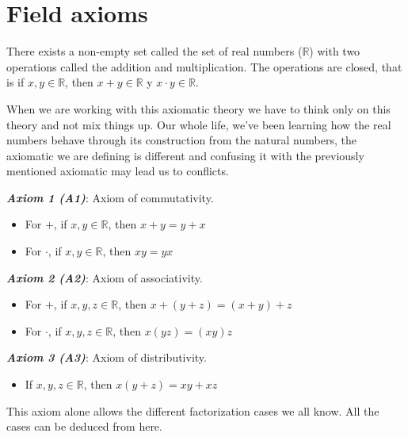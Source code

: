 \documentclass{report}
\begin{document}
    \section{Field axioms}

    There exists a non-empty set called the set of real numbers ($\mathbb{R}$) with two operations called the addition and multiplication. The operations are closed, that is if $x,y \in \mathbb{R}$, then $x+y \in \mathbb{R}$ y $x\cdot y \in \mathbb{R}$.

    \begin{noteBox}
        When we are working with this axiomatic theory we have to think only on this theory and not mix things up. Our whole life, we've been learning how the real numbers behave through its construction from the natural numbers, the axiomatic we are defining is different and confusing it with the previously mentioned axiomatic may lead us to conflicts.
    \end{noteBox}

    \begin{axBox}
        \textit{\textbf{Axiom 1 (A1)}}: Axiom of commutativity.
        \begin{itemize}
            \item For $+$, if $x,y \in \mathbb{R}$, then $x+y = y+x$
            \item For $\cdot$, if $x,y \in \mathbb{R}$, then $xy = yx$
        \end{itemize}
    \end{axBox}

    \begin{axBox}
        \textit{\textbf{Axiom 2 (A2)}}: Axiom of associativity.
        \begin{itemize}
            \item For $+$, if $x,y,z \in \mathbb{R}$, then $x+(y+z) = (x+y) + z$
            \item For $\cdot$, if $x,y,z \in \mathbb{R}$, then $x(yz) = (xy)z$
        \end{itemize}
    \end{axBox}

    \begin{axBox}
        \textit{\textbf{Axiom 3 (A3)}}: Axiom of distributivity.
        \begin{itemize}
            \item If $x,y,z \in \mathbb{R}$, then $x(y+z) = xy + xz$
        \end{itemize}
        \begin{noteBox}
            This axiom alone allows the different factorization cases we all know. All the cases can be deduced from here.
        \end{noteBox}
    \end{axBox}
\end{document}
